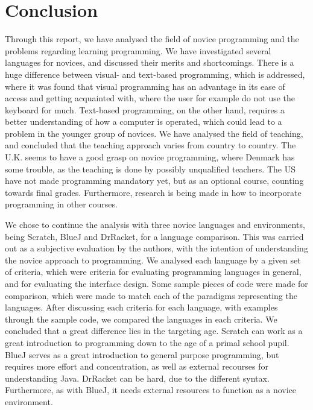 \chapter{Conclusion}
\label{chap:conclusion}

Through this report, we have analysed the field of novice programming and the problems regarding learning programming. We have investigated several languages for novices, and discussed their merits and shortcomings. There is a huge difference between visual- and text-based programming, which is addressed, where it was found that visual programming has an advantage in its ease of access and getting acquainted with, where the user for example do not use the keyboard for much. Text-based programming, on the other hand, requires a better understanding of how a computer is operated, which could lead to a problem in the younger group of novices. We have analysed the field of teaching, and concluded that the teaching approach varies from country to country. The U.K. seems to have a good grasp on novice programming, where Denmark has some trouble, as the teaching is done by possibly unqualified teachers. The US have not made programming mandatory yet, but as an optional course, counting towards final grades. Furthermore, research is being made in how to incorporate programming in other courses.

We chose to continue the analysis with three novice languages and environments, being Scratch, BlueJ and DrRacket, for a language comparison. This was carried out as a subjective evaluation by the authors, with the intention of understanding the novice approach to programming. We analysed each language by a given set of criteria, which were criteria for evaluating programming languages in general, and for evaluating the interface design. Some sample pieces of code were made for comparison, which were made to match each of the paradigms representing the languages. After discussing each criteria for each language, with examples through the sample code, we compared the languages in each criteria. We concluded that a great difference lies in the targeting age. Scratch can work as a great introduction to programming down to the age of a primal school pupil. BlueJ serves as a great introduction to general purpose programming, but requires more effort and concentration, as well as external recourses for understanding Java. DrRacket can be hard, due to the different syntax. Furthermore, as with BlueJ, it needs external resources to function as a novice environment.



